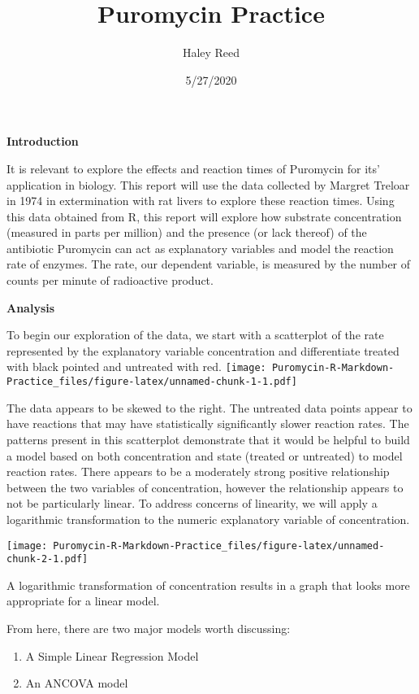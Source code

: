 \documentclass[
]{article}
\title{Puromycin Practice}
\author{Haley Reed}
\date{5/27/2020}
\begin{document}
\maketitle

\textbf{Introduction}

It is relevant to explore the effects and reaction times of Puromycin
for its' application in biology. This report will use the data collected
by Margret Treloar in 1974 in extermination with rat livers to explore
these reaction times. Using this data obtained from R, this report will
explore how substrate concentration (measured in parts per million) and
the presence (or lack thereof) of the antibiotic Puromycin can act as
explanatory variables and model the reaction rate of enzymes. The rate,
our dependent variable, is measured by the number of counts per minute
of radioactive product.

\textbf{Analysis}

To begin our exploration of the data, we start with a scatterplot of the
rate represented by the explanatory variable concentration and
differentiate treated with black pointed and untreated with red.
\texttt{[image: Puromycin-R-Markdown-Practice\_files/figure-latex/unnamed-chunk-1-1.pdf]}

The data appears to be skewed to the right. The untreated data points
appear to have reactions that may have statistically significantly
slower reaction rates. The patterns present in this scatterplot
demonstrate that it would be helpful to build a model based on both
concentration and state (treated or untreated) to model reaction rates.
There appears to be a moderately strong positive relationship between
the two variables of concentration, however the relationship appears to
not be particularly linear. To address concerns of linearity, we will
apply a logarithmic transformation to the numeric explanatory variable
of concentration.

\texttt{[image: Puromycin-R-Markdown-Practice\_files/figure-latex/unnamed-chunk-2-1.pdf]}

A logarithmic transformation of concentration results in a graph that
looks more appropriate for a linear model.

From here, there are two major models worth discussing:

\begin{enumerate}
\def\labelenumi{\arabic{enumi}.}
\item
  A Simple Linear Regression Model
\item
  An ANCOVA model
\end{enumerate}
\end{document}
